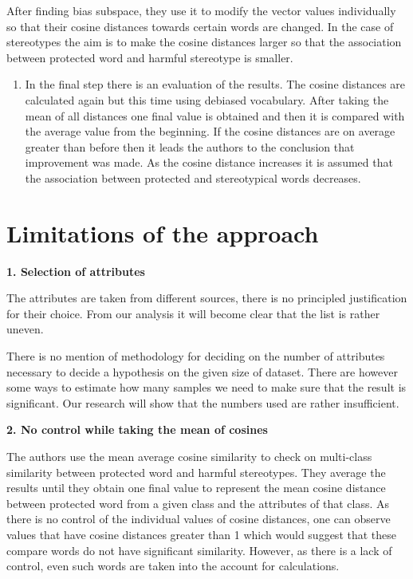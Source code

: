\documentclass[
  12pt,
]{book}
\providecommand{\tightlist}{%
  \setlength{\itemsep}{0pt}\setlength{\parskip}{0pt}}
\begin{document}
After finding bias subspace, they use it to modify the vector values individually so that their cosine distances towards certain words are changed. In the case of stereotypes the aim is to make the cosine distances larger so that the association between protected word and harmful stereotype is smaller.

\begin{enumerate}
\def\labelenumi{\arabic{enumi}.}
\setcounter{enumi}{3}
\tightlist
\item
  In the final step there is an evaluation of the results. The cosine distances are calculated again but this time using debiased vocabulary. After
  taking the mean of all distances one final value is obtained and then it is compared with the average value from the beginning. If the cosine distances are on average greater than before then it leads the authors to the conclusion that improvement was made. As the cosine distance increases it is assumed that the association between protected and stereotypical words decreases.
\end{enumerate}

\hypertarget{limitations-of-the-approach}{%
\section{Limitations of the approach}\label{limitations-of-the-approach}}

\textbf{1. Selection of attributes}

The attributes are taken from different sources, there is no principled justification for their choice. From our analysis it will become clear that
the list is rather uneven.

There is no mention of methodology for deciding on the number of attributes necessary to decide a hypothesis on the given size of dataset. There are however some ways to estimate how many samples we need to make sure that the result is significant. Our research will show that the numbers used
are rather insufficient.

\textbf{2. No control while taking the mean of cosines}

The authors use the mean average cosine similarity to check on multi-class similarity between protected word and harmful stereotypes.
They average the results until they obtain one final value to represent the mean cosine distance between protected word from a given class and the
attributes of that class. As there is no control of the individual values of cosine distances, one can observe values that have cosine distances
greater than 1 which would suggest that these compare words do not have significant similarity. However, as there is a lack of control, even such
words are taken into the account for calculations.
\end{document}
